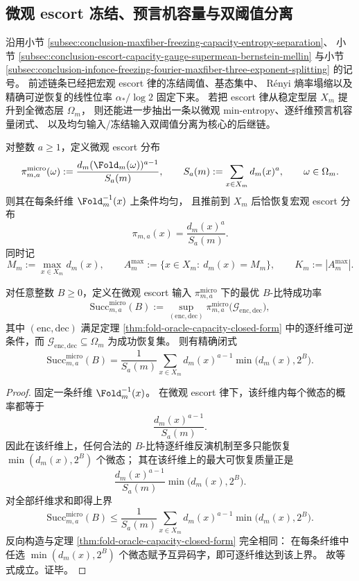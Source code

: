\subsection{微观 escort 冻结、预言机容量与双阈值分离}\label{subsec:conclusion-microescort-freezing-oracle-bitrate-separation}
沿用小节 \ref{subsec:conclusion-maxfiber-freezing-capacity-entropy-separation}、
小节 \ref{subsec:conclusion-escort-capacity-gauge-supermean-bernstein-mellin}
与小节 \ref{subsec:conclusion-infonce-freezing-fourier-maxfiber-three-exponent-splitting}
的记号。
前述链条已经把宏观 escort 律的冻结阈值、基态集中、
Rényi 熵率塌缩以及精确可逆恢复的线性位率
\(\alpha_\ast/\log 2\) 固定下来。
若把 escort 律从稳定型层 \(X_m\) 提升到全微态层 \(\Omega_m\)，
则还能进一步抽出一条以微观 min-entropy、逐纤维预言机容量闭式、
以及均匀输入/冻结输入双阈值分离为核心的后继链。

对整数 \(a\ge 1\)，定义微观 escort 分布
\[
\pi_{m,a}^{\mathrm{micro}}(\omega)
:=
\frac{d_m(\Fold_m(\omega))^{a-1}}{S_a(m)},
\qquad
S_a(m):=\sum_{x\in X_m}d_m(x)^a,
\qquad
\omega\in\Omega_m.
\]
则其在每条纤维 \(\Fold_m^{-1}(x)\) 上条件均匀，
且推前到 \(X_m\) 后恰恢复宏观 escort 分布
\[
\pi_{m,a}(x)=\frac{d_m(x)^a}{S_a(m)}.
\]
同时记
\[
M_m:=\max_{x\in X_m}d_m(x),
\qquad
A_m^{\max}:=\{x\in X_m:\ d_m(x)=M_m\},
\qquad
K_m:=|A_m^{\max}|.
\]

\begin{theorem}\label{thm:conclusion-microescort-oracle-capacity-closed-form}
对任意整数 \(B\ge 0\)，定义在微观 escort 输入 \(\pi_{m,a}^{\mathrm{micro}}\) 下的最优
\(B\)-比特成功率
\[
\mathrm{Succ}^{\mathrm{micro}}_{m,a}(B)
:=
\sup_{(\mathrm{enc},\mathrm{dec})}
\pi_{m,a}^{\mathrm{micro}}\!\bigl(\mathcal G_{\mathrm{enc},\mathrm{dec}}\bigr),
\]
其中 \((\mathrm{enc},\mathrm{dec})\) 满足定理 \ref{thm:fold-oracle-capacity-closed-form}
中的逐纤维可逆条件，而 \(\mathcal G_{\mathrm{enc},\mathrm{dec}}\subseteq\Omega_m\) 为成功恢复集。
则有精确闭式
\[
\mathrm{Succ}^{\mathrm{micro}}_{m,a}(B)
=
\frac{1}{S_a(m)}
\sum_{x\in X_m}
d_m(x)^{a-1}\min\bigl(d_m(x),2^B\bigr).
\]
\end{theorem}
\begin{proof}
固定一条纤维 \(\Fold_m^{-1}(x)\)。
在微观 escort 律下，该纤维内每个微态的概率都等于
\[
\frac{d_m(x)^{a-1}}{S_a(m)}.
\]
因此在该纤维上，任何合法的 \(B\)-比特逐纤维反演机制至多只能恢复
\(\min(d_m(x),2^B)\) 个微态；
其在该纤维上的最大可恢复质量正是
\[
\frac{d_m(x)^{a-1}}{S_a(m)}\min\bigl(d_m(x),2^B\bigr).
\]
对全部纤维求和即得上界
\[
\mathrm{Succ}^{\mathrm{micro}}_{m,a}(B)
\le
\frac{1}{S_a(m)}
\sum_{x\in X_m}
d_m(x)^{a-1}\min\bigl(d_m(x),2^B\bigr).
\]
反向构造与定理 \ref{thm:fold-oracle-capacity-closed-form} 完全相同：
在每条纤维中任选 \(\min(d_m(x),2^B)\) 个微态赋予互异码字，即可逐纤维达到该上界。
故等式成立。证毕。
\end{proof}

